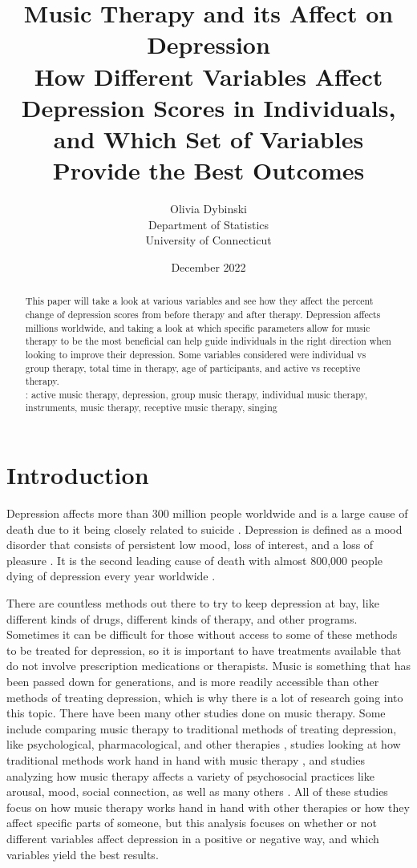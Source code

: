 \documentclass[12pt]{article}
\title{Music Therapy and its Affect on Depression \\[1ex] \large How Different Variables Affect Depression Scores in Individuals, and Which Set of Variables Provide the Best Outcomes}
\author{Olivia Dybinski\\
  Department of Statistics\\
  University of Connecticut}
\date{December 2022}
\begin{document}
  \newpage
  \maketitle
 \begin{abstract}
 \label{sec:abstract}

 This paper will take a look at various variables and see how they affect the percent change of depression scores from before therapy and after therapy. Depression affects millions worldwide, and taking a look at which specific parameters allow for music therapy to be the most beneficial can help guide individuals in the right direction when looking to improve their depression. Some variables considered were individual vs group therapy, total time in therapy, age of participants, and active vs receptive therapy. \\
 
 :
 active music therapy, depression, group music therapy, individual music therapy, instruments, music therapy, receptive music therapy, singing

\end{abstract}

 \section{Introduction} 
 \label{sec:introduction}

 Depression affects more than 300 million people worldwide and is a large cause of death due to it being closely related to suicide \citet{PLOS}. Depression is defined as a mood disorder that consists of persistent low mood, loss of interest, and a loss of pleasure \citet{Cochrane}. It is the second leading cause of death with almost 800,000 people dying of depression every year worldwide \citet{PLOS}. 

 There are countless methods out there to try to keep depression at bay, like different kinds of drugs, different kinds of therapy, and other programs. Sometimes it can be difficult for those without access to some of these methods to be treated for depression, so it is important to have treatments available that do not involve prescription medications or therapists. Music is something that has been passed down for generations, and is more readily accessible than other methods of treating depression, which is why there is a lot of research going into this topic. There have been many other studies done on music therapy. Some include comparing music therapy to traditional methods of treating depression, like psychological, pharmacological, and other therapies \citet{Cochrane}, studies looking at how traditional methods work hand in hand with music therapy \citet{British}, and studies analyzing how music therapy affects a variety of psychosocial practices like arousal, mood, social connection, as well as many others \citet{Frontiers}. All of these studies focus on how music therapy works hand in hand with other therapies or how they affect specific parts of someone, but this analysis focuses on whether or not different variables affect depression in a positive or negative way, and which variables yield the best results. 
\end{document}
